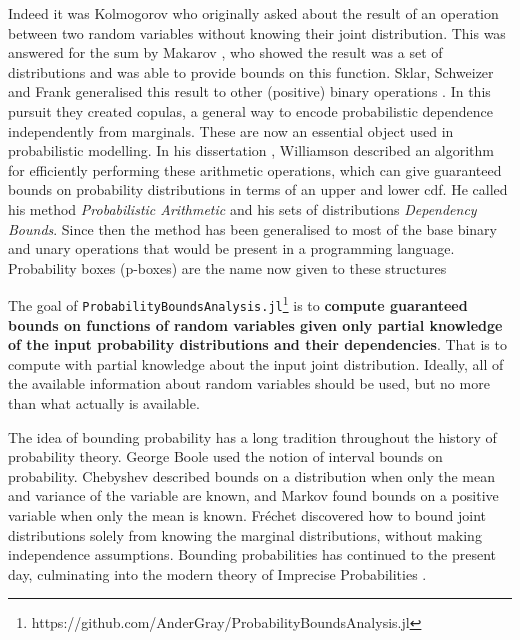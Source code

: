 \documentclass{juliacon}
\begin{document}
\noindent Indeed it was Kolmogorov who originally asked about the result of an operation between two random variables without knowing their joint distribution. This was answered for the sum by Makarov \cite{makarov1982estimates}, who showed the result was a set of distributions and was able to provide bounds on this function. Sklar, Schweizer and Frank generalised this result to other (positive) binary operations \cite{frank1987best,schweizer2011probabilistic}. In this pursuit they created copulas, a general way to encode probabilistic dependence independently from marginals. These are now an essential object used in probabilistic modelling. In his dissertation \cite{williamson1989probabilistic}, Williamson described an algorithm for efficiently performing these arithmetic operations, which can give guaranteed bounds on probability distributions in terms of an upper and lower cdf. He called his method \textit{Probabilistic Arithmetic} and his sets of distributions \textit{Dependency Bounds}. Since then the method has been generalised \cite{ferson2015constructing,ferson1996whereof,ferson2004arithmetic} to most of the base binary and unary operations that would be present in a programming language. Probability boxes (p-boxes) are the name now given to these structures

The goal of \texttt{ProbabilityBoundsAnalysis.jl}\footnote{https://github.com/AnderGray/ProbabilityBoundsAnalysis.jl} is to \textbf{compute guaranteed bounds on functions of random variables given only partial knowledge of the input probability distributions and their dependencies}. That is to compute with partial knowledge about the input joint distribution. Ideally, all of the available information about random variables should be used, but no more than what actually is available.

The idea of bounding probability has a long tradition throughout the history of probability theory. George Boole \cite{boole1854investigation, hailperin1986boole} used the notion of interval bounds on probability. Chebyshev \cite{chebyshev1874valeurs} described bounds on a distribution when only the mean and variance of the variable are known, and Markov \cite{markoff1900question} found bounds on a positive variable when only the mean is known.  Fréchet \cite{frechet1935generalisation} discovered how to bound joint distributions solely from knowing the marginal distributions, without making independence assumptions. Bounding probabilities has continued to the present day, culminating into the modern theory of Imprecise Probabilities \cite{walley1991statistical, klir2013uncertainty, troffaes2014lower, augustin2014introduction}.
\end{document}
